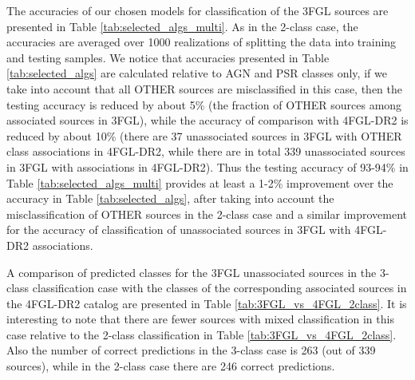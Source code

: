 The accuracies of our chosen models for classification of the 3FGL sources are presented in Table \ref{tab:selected_algs_multi}.
As in the 2-class case, the accuracies are averaged over 1000 realizations of splitting the data into training and testing samples.
We notice that accuracies presented in Table \ref{tab:selected_algs} are calculated relative to AGN and PSR classes only, if we take into account that all OTHER sources
are misclassified in this case, then the testing accuracy is reduced by about 5\% (the fraction of OTHER sources among associated sources in 3FGL),
while the accuracy of comparison with 4FGL-DR2 is reduced by about 10\% (there are 37 unassociated sources in 3FGL with OTHER class associations in 4FGL-DR2,
while there are in total 339 unassociated sources in 3FGL with associations in 4FGL-DR2).
Thus the testing accuracy of 93-94\% in Table \ref{tab:selected_algs_multi} provides at least a 1-2\% improvement over the accuracy in Table \ref{tab:selected_algs},
after taking into account the misclassification of OTHER sources in the 2-class case
and a similar improvement for the accuracy of classification of unassociated sources in 3FGL with 4FGL-DR2 associations.

A comparison of predicted classes for the 3FGL unassociated sources in the 3-class classification case with the classes of the corresponding associated sources in the 4FGL-DR2 catalog are presented in Table \ref{tab:3FGL_vs_4FGL_2class}.
It is interesting to note that there are fewer sources with mixed classification in this case relative to the 2-class classification in 
Table \ref{tab:3FGL_vs_4FGL_2class}.
Also the number of correct predictions in the 3-class case is 263 (out of 339 sources), while in the 2-class case there are 246 correct predictions.

